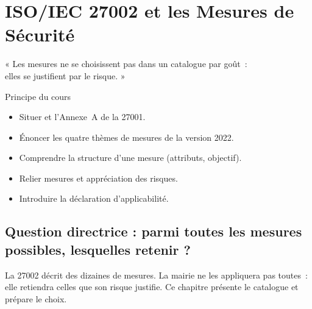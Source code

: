
\chapter{ISO/IEC 27002 et les Mesures de Sécurité}
\label{chap:iso27002}

\epigraph{%
    « Les mesures ne se choisissent pas dans un catalogue par goût~:\\
    elles se justifient par le risque. »%
}{Principe du cours}


\begin{boxobjectifs}
\begin{itemize}
    \item Situer  et l'Annexe~A de la 27001.
    \item Énoncer les quatre thèmes de mesures de la version 2022.
    \item Comprendre la structure d'une mesure (attributs, objectif).
    \item Relier mesures et appréciation des risques.
    \item Introduire la déclaration d'applicabilité.
\end{itemize}
\end{boxobjectifs}

\bigskip

\section*{Question directrice : parmi toutes les mesures possibles, lesquelles retenir ?}

La 27002 décrit des dizaines de mesures. La mairie ne les appliquera pas
toutes~: elle retiendra celles que son risque justifie. Ce chapitre présente le
catalogue et prépare le choix.

